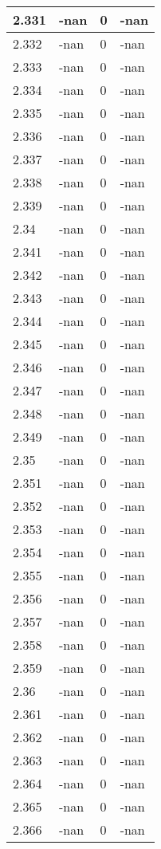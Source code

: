 \documentclass[a4paper,14pt]{extarticle}
\begin{document}
\begin{longtable}{||m{3cm}||m{3cm}|m{3cm}||m{3cm}||}
\hline
2.331 & -nan & 0 & -nan\\
\hline
2.332 & -nan & 0 & -nan\\
\hline
2.333 & -nan & 0 & -nan\\
\hline
2.334 & -nan & 0 & -nan\\
\hline
2.335 & -nan & 0 & -nan\\
\hline
2.336 & -nan & 0 & -nan\\
\hline
2.337 & -nan & 0 & -nan\\
\hline
2.338 & -nan & 0 & -nan\\
\hline
2.339 & -nan & 0 & -nan\\
\hline
2.34 & -nan & 0 & -nan\\
\hline
2.341 & -nan & 0 & -nan\\
\hline
2.342 & -nan & 0 & -nan\\
\hline
2.343 & -nan & 0 & -nan\\
\hline
2.344 & -nan & 0 & -nan\\
\hline
2.345 & -nan & 0 & -nan\\
\hline
2.346 & -nan & 0 & -nan\\
\hline
2.347 & -nan & 0 & -nan\\
\hline
2.348 & -nan & 0 & -nan\\
\hline
2.349 & -nan & 0 & -nan\\
\hline
2.35 & -nan & 0 & -nan\\
\hline
2.351 & -nan & 0 & -nan\\
\hline
2.352 & -nan & 0 & -nan\\
\hline
2.353 & -nan & 0 & -nan\\
\hline
2.354 & -nan & 0 & -nan\\
\hline
2.355 & -nan & 0 & -nan\\
\hline
2.356 & -nan & 0 & -nan\\
\hline
2.357 & -nan & 0 & -nan\\
\hline
2.358 & -nan & 0 & -nan\\
\hline
2.359 & -nan & 0 & -nan\\
\hline
2.36 & -nan & 0 & -nan\\
\hline
2.361 & -nan & 0 & -nan\\
\hline
2.362 & -nan & 0 & -nan\\
\hline
2.363 & -nan & 0 & -nan\\
\hline
2.364 & -nan & 0 & -nan\\
\hline
2.365 & -nan & 0 & -nan\\
\hline
2.366 & -nan & 0 & -nan\\

\end{longtable}
\end{document}
